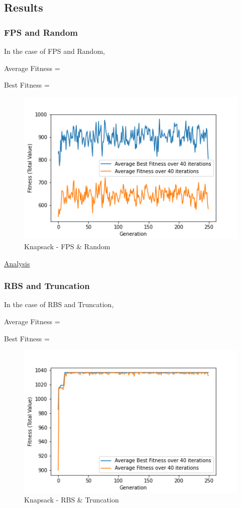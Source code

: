 \documentclass[11pt, letterpaper]{article}
\begin{document}
\subsection{Results} 
\subsubsection {FPS and Random}
In the case of FPS and Random,

Average Fitness =

Best Fitness = 
\begin{figure}[H]
    \centering
    \includegraphics[scale = 0.6]{images/knapsack_fp_rd.png}
    \caption {Knapsack - FPS \& Random}
    \label {fig:kpFR}
\end{figure}
\underline{Analysis}
\subsubsection {RBS and Truncation}
In the case of RBS and Truncation,

Average Fitness = 

Best Fitness = 
\begin{figure}[h]
    \centering
    \includegraphics[scale = 0.6]{images/knapsack_rb_tr.png}
    \caption {Knapsack - RBS \& Truncation}
    \label {fig:kpBT}
\end{figure}
\end{document}

